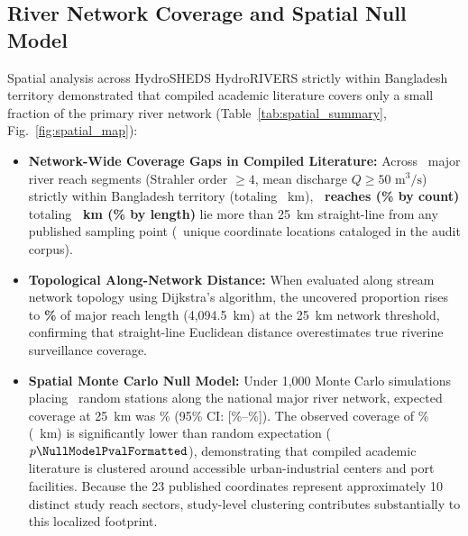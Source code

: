 \documentclass[authoryear,preprint,12pt]{elsarticle}
\begin{document}
\subsection{River Network Coverage and Spatial Null Model}
Spatial analysis across HydroSHEDS HydroRIVERS strictly within Bangladesh territory demonstrated that compiled academic literature covers only a small fraction of the primary river network (Table~\ref{tab:spatial_summary}, Fig.~\ref{fig:spatial_map}):
\begin{itemize}
    \item \textbf{Network-Wide Coverage Gaps in Compiled Literature:} Across \TotalMajorReachesCount\ major river reach segments (Strahler order $\ge 4$, mean discharge $Q \ge 50\text{ m}^3/\text{s}$) strictly within Bangladesh territory (totaling \TotalMajorLengthKm~km), \textbf{\UnsampledCountTwentyFiveKm\ reaches (\UnsampledPctCountTwentyFiveKm\% by count)} totaling \textbf{\UnsampledLengthTwentyFiveKm~km (\UnsampledPctLengthTwentyFiveKm\% by length)} lie more than 25~km straight-line from any published sampling point (\UniqueStationCoordinates\ unique coordinate locations cataloged in the audit corpus).
    \item \textbf{Topological Along-Network Distance:} When evaluated along stream network topology using Dijkstra's algorithm, the uncovered proportion rises to \textbf{\UnsampledPctLengthNetworkTwentyFiveKm\%} of major reach length (4,094.5~km) at the 25~km network threshold, confirming that straight-line Euclidean distance overestimates true riverine surveillance coverage.
    \item \textbf{Spatial Monte Carlo Null Model:} Under 1,000 Monte Carlo simulations placing \UniqueStationCoordinates\ random stations along the national major river network, expected coverage at 25~km was \NullModelMeanCoveragePct\% (95\% CI: [\NullModelCiLoPct\%--\NullModelCiHiPct\%]). The observed coverage of \ObservedCoveredPct\% (\ObservedCoveredLengthKm~km) is significantly lower than random expectation ($p \NullModelPvalFormatted$), demonstrating that compiled academic literature is clustered around accessible urban-industrial centers and port facilities. Because the 23 published coordinates represent approximately 10 distinct study reach sectors, study-level clustering contributes substantially to this localized footprint.
\end{itemize}
\end{document}

